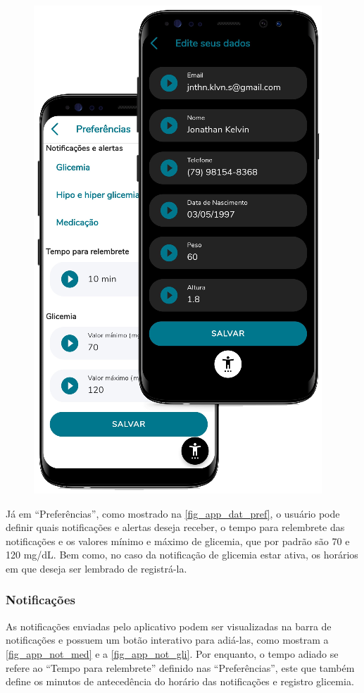 \begin{figure}[htb]
\begin{minipage}{0.53\textwidth}
        \includegraphics[scale=0.56]{Imagens/desenvolvimento/app/app_dat_pref.png}
    \end{minipage}
\end{figure}

Já em “Preferências”, como mostrado na \autoref{fig_app_dat_pref}, o usuário pode definir quais notificações
e alertas deseja receber, o tempo para relembrete das notificações e os valores mínimo e máximo de glicemia,
que por padrão são 70 e 120 mg/dL. Bem como, no caso da notificação de glicemia estar ativa, os horários em
que deseja ser lembrado de registrá-la.

\newpage

\subsubsection{Notificações}

As notificações enviadas pelo aplicativo podem ser visualizadas na barra de notificações e possuem um botão
interativo para adiá-las, como mostram a \autoref{fig_app_not_med} e a \autoref{fig_app_not_gli}. Por enquanto,
o tempo adiado se refere ao ``Tempo para relembrete'' definido nas “Preferências”, este que também define
os minutos de antecedência do horário das notificações e registro glicemia.

